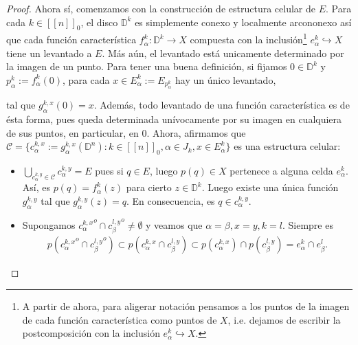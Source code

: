 \documentclass[11pt]{article}
\newcommand{\D}{\mathbb{D}}
\newcommand{\tint}[1]{#1^o}%
\newcommand{\nat}[1]{[\![#1]\!]}
\newcommand{\natzero}[1]{\nat{#1}_0}
\newcommand{\paint}[2]{\color{#1}{#2}}
\begin{document}
\begin{proof}
Ahora s\'i, comenzamos con la construcci\'on de estructura celular de $E$. Para cada $k \in \natzero{n}$, el disco $\D^k$ es simplemente conexo y localmente arcononexo as\'i que cada funci\'on caracter\'istica $f_\alpha^k : \D^k \to X$ compuesta con la inclusi\'on\footnote{A partir de ahora, para aligerar notaci\'on pensamos a los puntos de la imagen de cada funci\'on caracter\'istica como puntos de $X$, i.e. dejamos de escribir la postcomposici\'on con la inclusi\'on $e_\alpha^k \hookrightarrow X$.} $e_\alpha^k \hookrightarrow X$ tiene un levantado a $E$. M\'as a\'un, el levantado est\'a unicamente determinado por la imagen de un punto. Para tener una buena definici\'on, si fijamos $0 \in \D^k$ y $p_\alpha^k := f_\alpha^k(0)$, para cada $x \in E_\alpha^k := E_{p_\alpha^k}$ hay un \'unico levantado,
\begin{center}
\end{center}
tal que $g_\alpha^{k,x}(0) = x$. Adem\'as, todo levantado de una funci\'on caracter\'istica es de \'esta forma, pues queda determinada un\'ivocamente por su imagen en cualquiera de sus puntos, en particular, en $0$. Ahora, afirmamos que $\mathcal{C} = \{c_\alpha^{k,x} := g_\alpha^{k,x}(\D^n) : k \in \natzero{n},\alpha \in J_k, x \in E_\alpha^k\}$ es una estructura celular:
\begin{itemize}
\item[\paint{grey-light-blue}{(i)}] $\bigcup_{c_\alpha^{k,y} \in \mathcal{C}}c_\alpha^{k,y} = E$ pues si $q \in E$, luego $p(q)  \in X$ pertenece a alguna celda $e_\alpha^k$. As\'i, es $p(q) = f_\alpha^k(z)$ para cierto $z \in \D^k$. Luego existe una \'unica funci\'on $g_\alpha^{k,y}$ tal que $g_\alpha^{k,y}(z) = q$. En consecuencia, es $q \in c_\alpha^{k,y}$.
\item[\paint{grey-light-blue}{(ii)}] Supongamos $\tint{{c_\alpha^{k,x}}} \cap \tint{{c_\beta^{l,y}}} \neq \emptyset$ y veamos que $\alpha = \beta, x = y, k = l$. Siempre es
\begin{align}
p(\tint{{c_\alpha^{k,x}}} \cap \tint{{c_\beta^{l,y}}}) \subset p(c_\alpha^{k,x} \cap c_\beta^{l,y}) \subset p(c_\alpha^{k,x}) \cap p(c_\beta^{l,y}) = e_\alpha^k \cap e_\beta^l. 

\end{align}
\end{itemize}
\end{proof}
\end{document}
